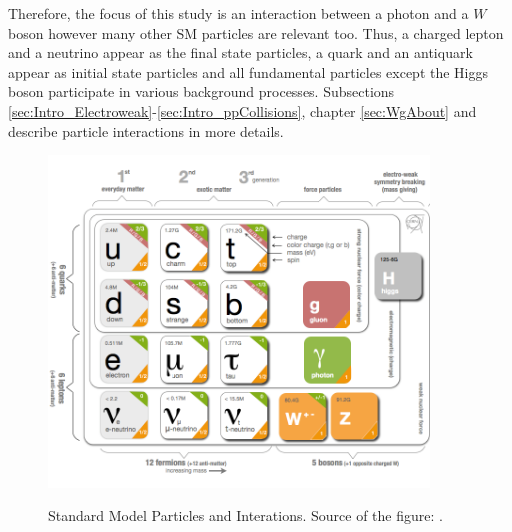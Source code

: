 
Therefore, the focus of this study is an interaction between a photon and a $W$ boson however many other SM particles are relevant too. Thus, a charged lepton and a neutrino appear as the final state particles, a quark and an antiquark appear as initial state particles and all fundamental particles except the Higgs boson participate in various background processes. Subsections \ref{sec:Intro_Electroweak}-\ref{sec:Intro_ppCollisions}, chapter \ref{sec:WgAbout} and \cite{ref_Griffiths} describe particle interactions in more details.\\


\begin{figure}[htb]
  \begin{center}
    {\includegraphics[width=0.90\textwidth]{../figs/Intro/StandardModel.png}}
    \caption{Standard Model Particles and Interations. Source of the figure: \cite{ref_fig_SM}.}
    \label{fig:SMtable}
  \end{center}
\end{figure}






